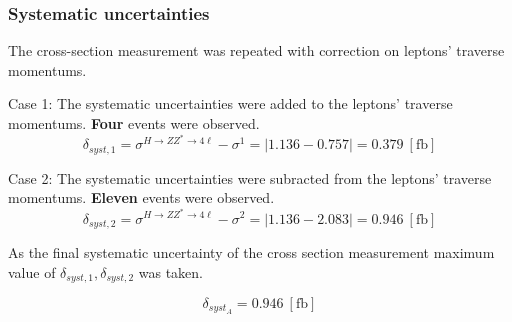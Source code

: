 \documentclass[aspectratio=1610, english]{beamer}
\newcommand{\hzz}{ H\rightarrow ZZ^{*}\rightarrow 4 \ell}
\begin{document}
\begin{frame}
\frametitle{Systematic uncertainties}
The cross-section measurement was repeated with correction on leptons' traverse momentums.\\
\vspace{0.5cm}

Case 1: The systematic uncertainties were added to the leptons' traverse momentums.
\textbf{Four} events were observed.
\begin{equation}
\delta_{syst, 1} = \sigma^{\hzz} - \sigma^1 = | 1.136 - 0.757 | = 0.379 \: [\mathrm{fb}]
\end{equation}

Case 2: The systematic uncertainties were subracted from the leptons' traverse momentums.
\textbf{Eleven} events were observed.
\begin{equation}
\delta_{syst, 2} = \sigma^{\hzz} - \sigma^2 = | 1.136 - 2.083 | = 0.946 \: [\mathrm{fb}]
\end{equation}

As the final systematic uncertainty of the cross section measurement maximum value of $\delta_{syst, 1}, \delta_{syst, 2}$ was taken.

\begin{equation}
\delta_{syst_A} = 0.946 \: [\mathrm{fb}]
\end{equation}

\end{frame}
\end{document}
